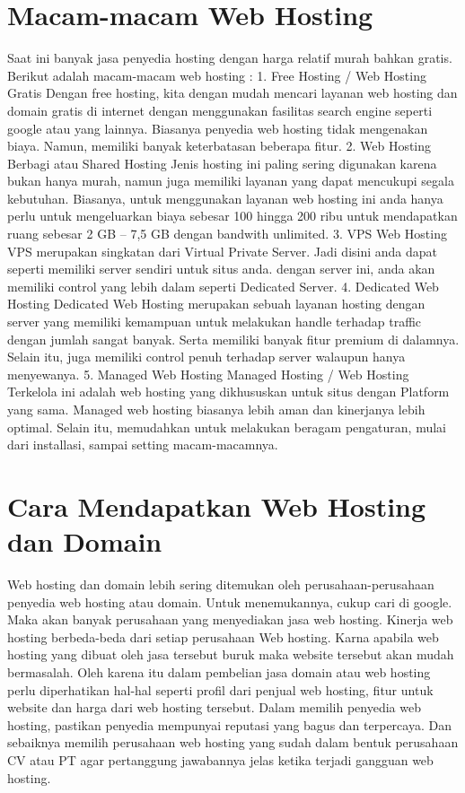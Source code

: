 \documentclass[12pt, a4paper]{article}
\begin{document}
\section{Macam-macam Web Hosting}
Saat ini banyak jasa penyedia hosting dengan harga relatif murah bahkan gratis.
Berikut adalah macam-macam web hosting :
	1.	Free Hosting / Web Hosting Gratis
		Dengan free hosting, kita dengan mudah mencari layanan web hosting dan domain gratis di internet dengan
		menggunakan fasilitas search engine seperti google atau yang lainnya. Biasanya penyedia web hosting tidak
		mengenakan biaya. Namun, memiliki banyak keterbatasan beberapa fitur.
	2.	Web Hosting Berbagi atau Shared Hosting
		Jenis hosting ini paling sering digunakan karena bukan hanya murah, namun juga memiliki layanan yang dapat
		mencukupi segala kebutuhan. Biasanya, untuk menggunakan layanan web hosting ini anda hanya perlu untuk mengeluarkan
		biaya sebesar 100 hingga 200 ribu untuk mendapatkan ruang sebesar 2 GB – 7,5 GB dengan bandwith unlimited.
	3.	VPS Web Hosting
		VPS merupakan singkatan dari Virtual Private Server. Jadi disini anda dapat seperti memiliki server sendiri
		untuk situs anda. dengan server ini, anda akan memiliki control yang lebih dalam seperti Dedicated Server.
	4.	Dedicated Web Hosting
		Dedicated Web Hosting merupakan sebuah layanan hosting dengan server yang memiliki kemampuan untuk melakukan
		handle terhadap traffic dengan jumlah sangat banyak. Serta memiliki banyak fitur premium di dalamnya. Selain itu,
		juga memiliki control penuh terhadap server walaupun  hanya menyewanya.
	5.	Managed Web Hosting
		Managed Hosting / Web Hosting Terkelola ini adalah web hosting yang dikhususkan untuk situs dengan
		Platform yang sama. Managed web hosting biasanya lebih aman dan kinerjanya lebih optimal. Selain itu,
		memudahkan untuk melakukan beragam pengaturan, mulai dari installasi, sampai setting macam-macamnya.

\section{Cara Mendapatkan Web Hosting dan Domain}
	Web hosting dan domain lebih sering ditemukan oleh perusahaan-perusahaan penyedia web hosting atau domain. Untuk menemukannya, cukup cari di google. Maka akan banyak perusahaan yang menyediakan jasa web hosting. Kinerja web hosting berbeda-beda dari setiap perusahaan Web hosting. Karna apabila web hosting yang dibuat oleh jasa tersebut buruk maka website tersebut akan mudah bermasalah. Oleh karena itu dalam pembelian jasa domain atau web hosting perlu diperhatikan hal-hal seperti profil dari penjual web hosting, fitur untuk website dan harga dari web hosting tersebut. Dalam memilih penyedia web hosting, pastikan penyedia mempunyai reputasi yang bagus dan terpercaya. Dan sebaiknya memilih perusahaan web hosting yang sudah dalam bentuk perusahaan CV atau PT agar pertanggung jawabannya jelas ketika terjadi gangguan web hosting.
\end{document}
